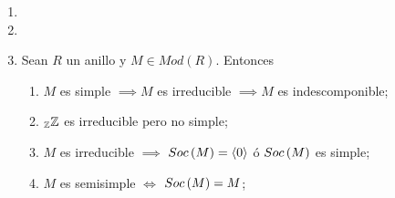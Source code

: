 \documentclass{article}
\begin{document}
\begin{enumerate}[label=\textbf{Ej \arabic*.}]
		\begin{proof}
			Se tiene el siguiente esquema
			\begin{center}
			\end{center}
			con $I'$ inyectivo y $f$, en partícular, un monomorfismo en $Mod(R)$ por ser un mono-esencial. Por lo tanto $\exists\ t\in\functhom{I}{I'}{R}$ tal que \begin{equation*}
				tf=f'.
			\end{equation*} 
			Como $f$ es un mono-esencial y $f'$ es en  partícular un monomorfismo en $Mod(R)$, de la igualdad anterior se sigue que $t$ es un monomorfismo en $Mod(R)$. Con lo cual, si $\pi$ es el epi canónico de $I'$ en $\faktor{I'}{Im\lrprth{t}}$, la sucesión
			\begin{center}
			\end{center}
			es exacta. De modo que es una sucesión exacta que se parte, puesto que $I$ es inyectivo (ver Ej. 65), con lo cual $t$ es un split-mono (ver Ej. 54) i.e. $\exists$ $t'\in\functhom{I'}{I}{R}$ tal que $t't=Id_I$. La igualdad anterior garantiza que $j$ es un split-epi. Además
			\begin{align*}
				tf=f'&\implies f=t'f',
			\end{align*}
			con lo cual $t'$ es un monomorfismo, pues $f$ lo es y $f'$ es un mono-esencial. Así $t'$ es un isomorfismo en $Mod(R)$ y por lo tanto $t=\lrprth{t'}^{-1}$ también lo es.\\
		\end{proof}		
		\item
		\item
		\item Sean $R$ un anillo y $M\in Mod(R)$. Entonces
		\begin{enumerate}
			\item $M$ es simple $\implies M$ es irreducible $\implies M$ es indescomponible;
			\item $\mathbb{\ringmod{\mathbb{Z}}{\mathbb{Z}}{l}}$ es irreducible pero no simple;
			\item $M$ es irreducible $\implies$ $Soc\left(M\right)=\left< 0\right>$ ó $Soc\left(M\right)$ es simple;
			\item $M$ es semisimple $\iff$ $Soc\left(M\right)=M$;

\end{enumerate}
\end{enumerate}
\end{document}
